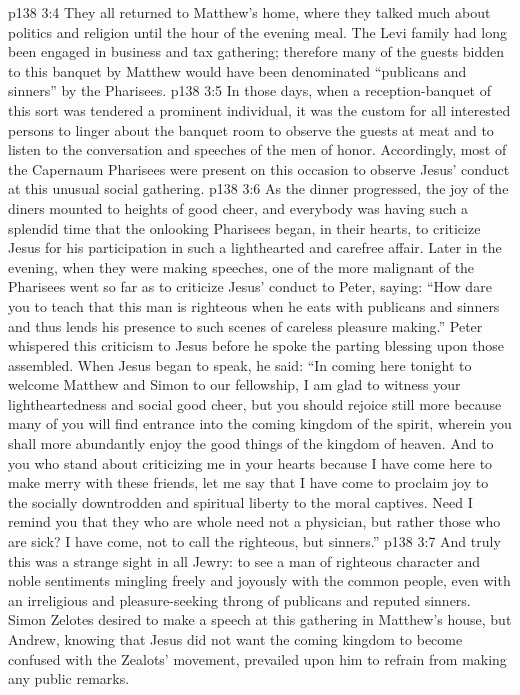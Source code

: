\pc \vs p138 3:4 They all returned to Matthew’s home, where they talked much about politics and religion until the hour of the evening meal. The Levi family had long been engaged in business and tax gathering; therefore many of the guests bidden to this banquet by Matthew would have been denominated “publicans and sinners” by the Pharisees.
\vs p138 3:5 In those days, when a reception\hyp{}banquet of this sort was tendered a prominent individual, it was the custom for all interested persons to linger about the banquet room to observe the guests at meat and to listen to the conversation and speeches of the men of honor. Accordingly, most of the Capernaum Pharisees were present on this occasion to observe Jesus’ conduct at this unusual social gathering.
\vs p138 3:6 As the dinner progressed, the joy of the diners mounted to heights of good cheer, and everybody was having such a splendid time that the onlooking Pharisees began, in their hearts, to criticize Jesus for his participation in such a lighthearted and carefree affair. Later in the evening, when they were making speeches, one of the more malignant of the Pharisees went so far as to criticize Jesus’ conduct to Peter, saying: “How dare you to teach that this man is righteous when he eats with publicans and sinners and thus lends his presence to such scenes of careless pleasure making.” Peter whispered this criticism to Jesus before he spoke the parting blessing upon those assembled. When Jesus began to speak, he said: \textcolor{ubdarkred}{“In coming here tonight to welcome Matthew and Simon to our fellowship, I am glad to witness your lightheartedness and social good cheer, but you should rejoice still more because many of you will find entrance into the coming kingdom of the spirit, wherein you shall more abundantly enjoy the good things of the kingdom of heaven. And to you who stand about criticizing me in your hearts because I have come here to make merry with these friends, let me say that I have come to proclaim joy to the socially downtrodden and spiritual liberty to the moral captives. Need I remind you that they who are whole need not a physician, but rather those who are sick? I have come, not to call the righteous, but sinners.”}
\vs p138 3:7 And truly this was a strange sight in all Jewry: to see a man of righteous character and noble sentiments mingling freely and joyously with the common people, even with an irreligious and pleasure\hyp{}seeking throng of publicans and reputed sinners. Simon Zelotes desired to make a speech at this gathering in Matthew’s house, but Andrew, knowing that Jesus did not want the coming kingdom to become confused with the Zealots’ movement, prevailed upon him to refrain from making any public remarks.
